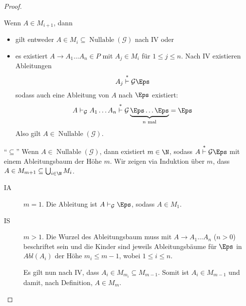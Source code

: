 \begin{proof}
\begin{description}
    Wenn $A \in M_{i+1}$, dann
    \begin{itemize}
    \item gilt entweder
      $A \in M_i \subseteq \operatorname{Nullable}(\mathcal{G})$ nach
      IV oder
    \item 
      es existiert $A \to A_1\ldots A_n \in P$ mit $A_j \in M_i$ für
      $1 \le j \le n$.
      Nach IV existieren Ableitungen
      \begin{displaymath}
        A_j \stackrel{*}{\vdash}\mathcal{G} \Eps
      \end{displaymath}
      sodass auch eine Ableitung von $A$ nach $\Eps$ existiert:
      \begin{displaymath}
        A  \vdash_\mathcal{G} A_1 \ldots A_n \stackrel{*}{\vdash}\mathcal{G} \underbrace{\Eps \ldots \Eps}_{n \text{ mal}} = \Eps
      \end{displaymath}
      Also gilt $A \in \operatorname{Nullable}(\mathcal{G})$.
    \end{itemize}
  \end{description}

  \medskip
  
  "`$\subseteq$"'\quad
  Wenn $A \in \operatorname{Nullable}(\mathcal{G})$, dann existiert $m
  \in \N$, sodass $A \stackrel{*}{\vdash}\mathcal{G} \Eps$ mit einem
  Ableitungsbaum der Höhe $m$.
  Wir zeigen via Induktion über $m$, dass $A \in M_{m+1} \subseteq \bigcup_{i \in \N} M_i$.
  \begin{description}
  \item[IA] $m = 1$. Die Ableitung ist $A \vdash_\mathcal{G} \Eps$, sodass $A\in M_1$.
  \item[IS] $m > 1$.
    Die Wurzel des Ableitungsbaum muss mit $A \to A_1\ldots A_n$ ($n>0$)
    beschriftet sein und die Kinder sind jeweils Ableitungsbäume für
    $\Eps$ in  $Abl(A_i)$ der Höhe $m_i \le m-1$, wobei $1 \le i \le n$.
    
    Es gilt nun nach IV, dass $A_i \in M_{m_i} \subseteq M_{m-1}$.
    Somit ist $A_i \in M_{m-1}$ und damit, nach Definition, $A \in M_m$.
    \qedhere
  \end{description}
\end{proof}

